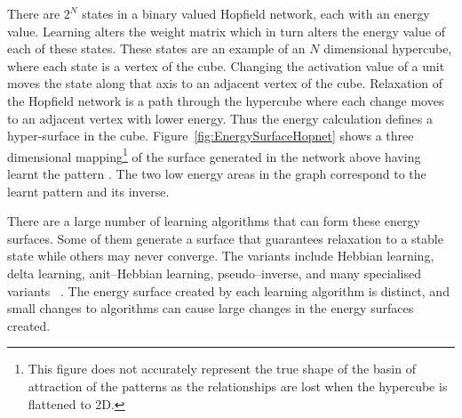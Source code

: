 There are $2^N$ states in a binary valued Hopfield network, each with an energy value.  Learning alters the weight matrix which in turn alters the energy value of each of these states.  These states are an example of an $N$ dimensional hypercube, where each state is a vertex of the cube.  Changing the activation value of a unit moves the state along that axis to an adjacent vertex of the cube. Relaxation of the Hopfield network is a path through the hypercube where each change moves to an adjacent vertex with lower energy.  Thus the energy calculation defines a hyper-surface in the cube.  Figure~\ref{fig:EnergySurfaceHopnet} shows a three dimensional mapping\footnote{This figure does not accurately represent the true shape of the basin of attraction of the patterns as the relationships are lost when the hypercube is flattened to 2D.} of the surface generated in the network above having learnt the pattern .  The two low energy areas in the graph correspond to the learnt pattern and its inverse.

There are a large number of learning algorithms that can form these energy surfaces.  Some of them generate a surface that guarantees relaxation to a stable state while others may never converge.  The variants include Hebbian learning, delta learning, anit--Hebbian learning, pseudo--inverse, and many specialised variants ~\citep{Amit95,Storkey1997,Athithan02}.  The energy surface created by each learning algorithm is distinct, and small changes to algorithms can cause large changes in the energy surfaces created.

